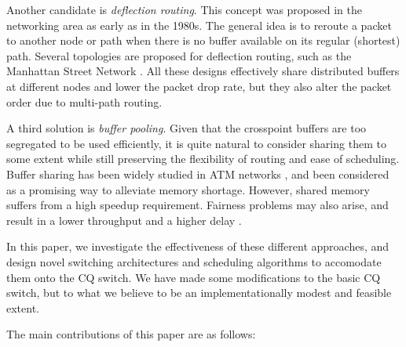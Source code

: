 \documentclass[journal,final,doublecolumn,10pt,twoside]{IEEEtranTCOM} \normalsize
\begin{document}
Another candidate is \emph{deflection routing}. This concept was proposed in the networking area as early as in the 1980s. The general idea is to reroute a packet to another node or path when there is no buffer available on its regular (shortest) path. Several topologies are proposed for deflection routing, such as the Manhattan Street Network \cite{msn}. All these designs effectively share distributed buffers at different nodes and lower the packet drop rate, but they also alter the packet order due to multi-path routing. 

A third solution is \emph{buffer pooling}. Given that the crosspoint buffers are too segregated to be used efficiently, it is quite natural to consider sharing them to some extent while still preserving the flexibility of routing and ease of scheduling. Buffer sharing has been widely studied in ATM networks \cite{sm}, and been considered as a promising way to alleviate memory shortage. However, shared memory suffers from a high speedup requirement. Fairness problems may also arise, and result in a lower throughput and a higher delay \cite{partitionsurvey}.




In this paper, we investigate the effectiveness of these different approaches, and design novel switching architectures and scheduling algorithms to accomodate them onto the CQ switch. We have made some modifications to the basic CQ switch, but to what we believe to be an implementationally modest and feasible extent. 

The main contributions of this paper are as follows:
\end{document}
